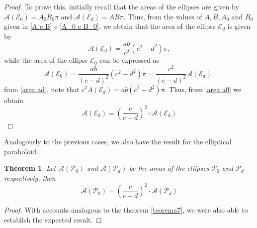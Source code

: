 \documentclass{amsart}
\theoremstyle{plain}
\newtheorem{theorem}{\bf Theorem}
\numberwithin{equation}{section}
\begin{document}
\begin{proof}
	To prove this, initially recall that the areas of the ellipses are given by \( \mathcal{A}(\mathcal{E}_0) = A_0 B_0 \pi \) and \( \mathcal{A}(\mathcal{E}_d) = A B \pi \). Thus, from the values of \( A, B, A_0 \) and \( B_0 \) given in \eqref{A e B} e \eqref{A_0 e B_0}, we obtain that the area of the ellipse \( \mathcal{E}_d \) is given by
	\begin{equation}\label{area ad}
		\mathcal{A}(\mathcal{E}_d) = \frac{ab}{c^2} (c^2 - d^2) \pi,
	\end{equation}
	while the area of the ellipse \( \mathcal{E}_0 \) can be expressed as
	\begin{equation}\label{area a0}
		\mathcal{A}(\mathcal{E}_0) = \frac{ab}{(c - d)^2} (c^2 - d^2) \pi = \dfrac{c^2}{(c-d)^2} \mathcal{A}(\mathcal{E}_d),
	\end{equation}
	from \eqref{area ad}, note that \( c^2 A(\mathcal{E}_d) = ab (c^2 - d^2) \pi \). Thus, from \eqref{area a0} we obtain
	$$
	\mathcal{A}(\mathcal{E}_0) = \left( \dfrac{c}{c-d} \right)^2  \cdot \mathcal{A}(\mathcal{E}_d)
	$$
	
	
\end{proof}

Analogously to the previous cases, we also have the result for the elliptical paraboloid.


\begin{theorem}\label{teorema8}
	Let \( \mathcal{A}(\mathcal{P}_0) \) and \( \mathcal{A}(\mathcal{P}_d) \) be the areas of the ellipses \( \mathcal{P}_0 \) and \( \mathcal{P}_d \) respectively, then
	\begin{equation}
		\mathcal{A}(\mathcal{P}_0) = \left(\frac{c}{c-d} \right)^{2} \cdot \mathcal{A}(\mathcal{P}_d)
	\end{equation}
\end{theorem}

\begin{proof}
	
	With accounts analogous to the theorem \ref{teorema7}, we were also able to establish the expected result.
	
\end{proof}
\end{document}
